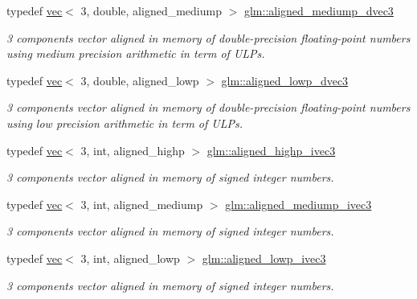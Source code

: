 \begin{DoxyCompactItemize}
typedef \mbox{\hyperlink{structglm_1_1vec}{vec}}$<$ 3, double, aligned\+\_\+mediump $>$ \mbox{\hyperlink{group__gtc__type__aligned_gacd6fc80d8b9b4322560c9c27927da5e5}{glm\+::aligned\+\_\+mediump\+\_\+dvec3}}
\begin{DoxyCompactList}\small\item\em 3 components vector aligned in memory of double-\/precision floating-\/point numbers using medium precision arithmetic in term of U\+L\+Ps. \end{DoxyCompactList}\item 
typedef \mbox{\hyperlink{structglm_1_1vec}{vec}}$<$ 3, double, aligned\+\_\+lowp $>$ \mbox{\hyperlink{group__gtc__type__aligned_gab8af6a04a9e5c763725913b11df3cec0}{glm\+::aligned\+\_\+lowp\+\_\+dvec3}}
\begin{DoxyCompactList}\small\item\em 3 components vector aligned in memory of double-\/precision floating-\/point numbers using low precision arithmetic in term of U\+L\+Ps. \end{DoxyCompactList}\item 
typedef \mbox{\hyperlink{structglm_1_1vec}{vec}}$<$ 3, int, aligned\+\_\+highp $>$ \mbox{\hyperlink{group__gtc__type__aligned_gaa469d8bf0cb9ae640c943d847ec48f95}{glm\+::aligned\+\_\+highp\+\_\+ivec3}}
\begin{DoxyCompactList}\small\item\em 3 components vector aligned in memory of signed integer numbers. \end{DoxyCompactList}\item 
typedef \mbox{\hyperlink{structglm_1_1vec}{vec}}$<$ 3, int, aligned\+\_\+mediump $>$ \mbox{\hyperlink{group__gtc__type__aligned_gad835ac79ecdcae8d6292b37656f54973}{glm\+::aligned\+\_\+mediump\+\_\+ivec3}}
\begin{DoxyCompactList}\small\item\em 3 components vector aligned in memory of signed integer numbers. \end{DoxyCompactList}\item 
typedef \mbox{\hyperlink{structglm_1_1vec}{vec}}$<$ 3, int, aligned\+\_\+lowp $>$ \mbox{\hyperlink{group__gtc__type__aligned_ga2862680efddc950ffe37245cb49dd960}{glm\+::aligned\+\_\+lowp\+\_\+ivec3}}
\begin{DoxyCompactList}\small\item\em 3 components vector aligned in memory of signed integer numbers. \end{DoxyCompactList}\item 

\end{DoxyCompactItemize}
